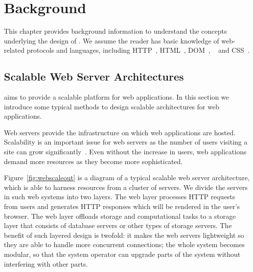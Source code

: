 \chapter{Background}

This chapter provides background information to understand the concepts
underlying the design of \cbtwo. We assume the reader has basic knowledge of
web-related protocols and languages, including HTTP~\cite{rfc7231},
HTML~\cite{hickson2012html},  DOM~\cite{2000Document},
\js~\cite{ecmascript2011ecmascript} and CSS~\cite{css21}.

\webscaleoutfig{}

\section{Scalable Web Server Architectures}
\label{sec:websys}

\cbtwo aims to provide a scalable platform for web applications.
In this section we introduce some typical methods to design
scalable architectures for web applications.

Web servers provide the infrastructure on which web applications 
are hosted.
Scalability is an important issue for web servers as the number of users
visiting a site can grow significantly~\cite{berners1998world}.
Even without the increase in users,
web applications demand more resources as they become more sophisticated.

Figure~\ref{fig:webscaleout} is a diagram of a typical scalable web server
architecture, which is able to harness resources from a cluster of servers. We
divide the servers in such web systems into two layers. The web layer
processes HTTP requests from users and generates HTTP responses which will be
rendered in the user's browser. The web layer offloads storage and
computational tasks to a storage layer that consists of database servers or
other types of storage servers. The benefit of such layered design is twofold:
it makes the web servers lightweight so they are able to handle more
concurrent  connections; the whole system becomes modular, so that the system
operator can upgrade parts of the system without interfering with other parts.

